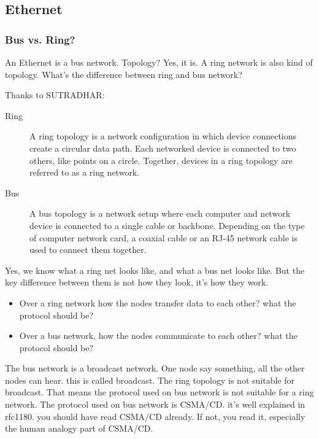 \documentclass{article}
\begin{document}
\subsection{Ethernet}
\label{sec:ethernet}


\subsubsection{Bus vs. Ring?}
\label{sec:bus-vs.-ring}

An Ethernet is a bus network. Topology?  Yes, it is. A ring network is also kind of
topology. What's the difference between ring and bus network?

Thanks to SUTRADHAR:
\begin{description}
\item[Ring] A ring topology is a network configuration in which device connections create
  a circular data path. Each networked device is connected to two others, like points on a
  circle. Together, devices in a ring topology are referred to as a ring network.
\item[Bus] A bus topology is a network setup where each computer and network device is
  connected to a single cable or backbone. Depending on the type of computer network card,
  a coaxial cable or an RJ-45 network cable is used to connect them together.
\end{description}

Yes, we know what a ring net looks like, and what a bus net looks like. But the key
difference between them is not how they look, it's how they work.

\begin{itemize}
\item Over a ring network how the nodes transfer data to each other? what the protocol
  should be?
\item Over a bus network, how the nodes communicate to each other? what the protocol should be?
\end{itemize}

The bus network is a broadcast network.  One node say something, all the other nodes can
hear. this is called broadcast.  The ring topology is not suitable for broadcast.  That
means the protocol used on bus network is not suitable for a ring network.  The protocol
used on bus network is CSMA/CD. it's well explained in rfc1180. you should have read
CSMA/CD already. If not, you read it, especially the human analogy part of CSMA/CD.
\end{document}
